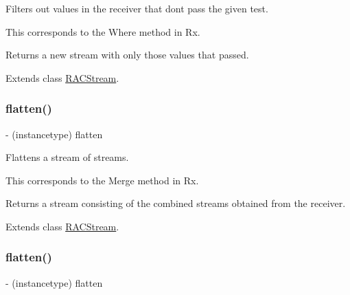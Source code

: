 Filters out values in the receiver that don\textquotesingle{}t pass the given test.

This corresponds to the {\ttfamily Where} method in Rx.

Returns a new stream with only those values that passed. 

Extends class \mbox{\hyperlink{interface_r_a_c_stream_ae6a990d05708acea33f1c31102f4989b}{R\+A\+C\+Stream}}.

\mbox{\label{category_r_a_c_stream_07_operations_08_a02767823dfe3d4682709e066e15e388c}} 
\subsubsection{\texorpdfstring{flatten()}{flatten()}\hspace{0.1cm}{\footnotesize\ttfamily [1/3]}}
{\footnotesize\ttfamily -\/ (instancetype) flatten \begin{DoxyParamCaption}{ }\end{DoxyParamCaption}}

Flattens a stream of streams.

This corresponds to the {\ttfamily Merge} method in Rx.

Returns a stream consisting of the combined streams obtained from the receiver. 

Extends class \mbox{\hyperlink{interface_r_a_c_stream_a02767823dfe3d4682709e066e15e388c}{R\+A\+C\+Stream}}.

\mbox{\label{category_r_a_c_stream_07_operations_08_a02767823dfe3d4682709e066e15e388c}} 
\subsubsection{\texorpdfstring{flatten()}{flatten()}\hspace{0.1cm}{\footnotesize\ttfamily [2/3]}}
{\footnotesize\ttfamily -\/ (instancetype) flatten \begin{DoxyParamCaption}{ }\end{DoxyParamCaption}}

